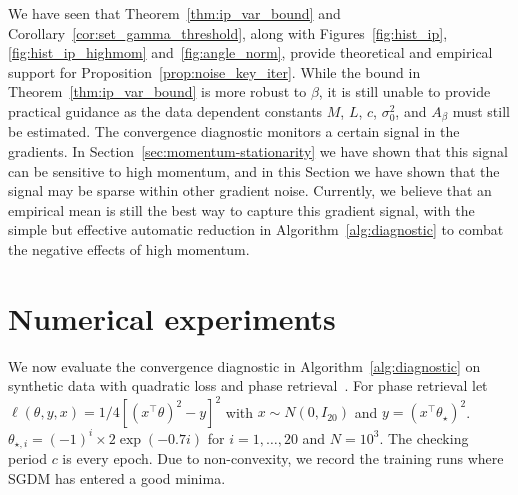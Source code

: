 \documentclass[conference]{IEEEtran}
\begin{document}
We have seen that Theorem~\ref{thm:ip_var_bound} and Corollary~\ref{cor:set_gamma_threshold}, along with Figures~\ref{fig:hist_ip}, \ref{fig:hist_ip_highmom} and~\ref{fig:angle_norm}, provide theoretical and empirical support for Proposition~\ref{prop:noise_key_iter}. While the bound in Theorem~\ref{thm:ip_var_bound} is more robust to $\beta$, it is still unable to provide practical guidance as  the data dependent constants $M$, $L$, $c$, $\sigma_0^2$, and $A_\beta$ must still be estimated.
The convergence diagnostic monitors a certain signal in the gradients.
In Section~\ref{sec:momentum-stationarity} we have shown that this signal can be sensitive to high momentum, and in this Section we have shown that the signal may be sparse within other gradient noise.
Currently, we believe that an empirical mean is still the best way to capture this gradient signal, with the simple but effective automatic reduction in Algorithm~\ref{alg:diagnostic} to combat the negative effects of high momentum. 


\section{Numerical experiments}\label{sec:synth-data-experiments}
We now evaluate the convergence diagnostic in Algorithm~\ref{alg:diagnostic} on synthetic data with quadratic loss  and phase retrieval~\cite{Article:Chen_MP19}.
For phase retrieval let $\ell ( \theta, y, x ) = 1/4 [ ( x^\top \theta )^2 - y ]^2$ with $x \sim N ( 0, I_{20} )$ and $y = ( x^\top \theta_\star )^2$.
$\theta_{\star,i} = (-1)^i \times 2 \exp( -0.7 i )$ for $i = 1, \dots, 20$ and $N = 10^3$.
The checking period $c$ is every epoch.
Due to non-convexity, we record the training runs where SGDM has entered a good minima.
\end{document}
